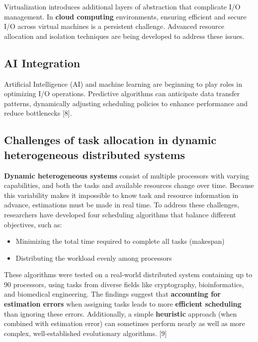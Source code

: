 \documentclass[a4paper]{article}
\begin{document}
Virtualization introduces additional layers of abstraction that complicate I/O management. 
In \textbf{cloud computing} environments, ensuring efficient and secure I/O across virtual machines is a 
persistent challenge. Advanced resource allocation and isolation techniques are being developed to
 address these issues.

 \subsection{AI Integration}

 Artificial Intelligence (AI) and machine learning are beginning to play roles in optimizing I/O 
 operations. Predictive algorithms can anticipate data transfer patterns, dynamically adjusting
scheduling policies to enhance performance and reduce bottlenecks [8].

\subsection{Challenges of task allocation in dynamic heterogeneous distributed systems}

\textbf{Dynamic heterogeneous systems} consist of multiple processors with varying capabilities, and both the tasks and available resources change over time. 
Because this variability makes it impossible to know task and resource information in advance, estimations must be made in real time.
To address these challenges, researchers have developed four scheduling algorithms that balance different objectives, such as:

\begin{itemize}
    \item Minimizing the total time required to complete all tasks (makespan)
    \item Distributing the workload evenly among processors
\end{itemize}
These algorithms were tested on a real-world distributed system containing up to 90 processors, using tasks
 from diverse fields like cryptography, bioinformatics, and biomedical engineering.
The findings suggest that \textbf{accounting for estimation errors} when assigning tasks leads to more \textbf{efficient scheduling} than ignoring these errors. Additionally, a simple \textbf{heuristic} approach (when combined 
with estimation error) can sometimes perform nearly as well as more complex,
 well-established evolutionary algorithms. [9]
\end{document}
